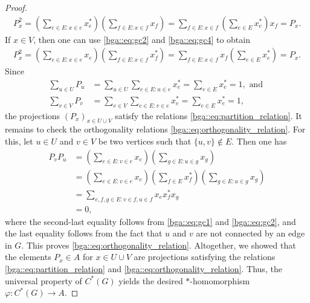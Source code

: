 \documentclass[a4paper]{amsart}
\begin{document}
\begin{proof}
    \begin{align*}
        P_x^2 = \left( \sum_{e \in E: x \in e} x_e^\ast \right) \left( \sum_{f \in E: x \in f} x_f \right)
            = \sum_{f \in E: x \in f} \left( \sum_{e \in E} x_e^\ast \right) x_f
            = P_x.
    \end{align*}
    If $x \in V$, then one can use \eqref{bga::eq:gc2} and \eqref{bga::eq:gc4} to obtain
    \begin{align*}
        P_x^2 = \left( \sum_{e \in E: x \in e} x_e \right) \left( \sum_{f \in E: x \in f} x_f^\ast \right)
            = \sum_{f \in E: x \in f} x_f \left( \sum_{e \in E} x_e^\ast \right)
            = P_x.
    \end{align*}
    Since
    \begin{align*}
        \sum_{u \in U} P_u &= \sum_{u \in U} \sum_{e \in E: u \in e} x_e^\ast = \sum_{e \in E} x_e^\ast = 1, \text{ and } \\
        \sum_{v \in V} P_v &= \sum_{v \in V} \sum_{e \in E: v \in e} x_e^\ast = \sum_{e \in E} x_e^\ast = 1,
    \end{align*}
    the projections $(P_x)_{x \in U \cup V}$ satisfy the relations \eqref{bga::eq:partition_relation}. It remains to check the orthogonality relations \eqref{bga::eq:orthogonality_relation}. For this, let $u \in U$ and $v \in V$ be two vertices such that $\{u, v\} \not \in E$. Then one has
    \begin{align*}
        P_v P_u &= \left( \sum_{e \in E: v \in e} x_e \right) \left( \sum_{g \in E: u \in g} x_g \right) \\
            &= \left( \sum_{e \in E: v \in e} x_e \right) \left( \sum_{f \in E} x_f^\ast \right) \left( \sum_{g \in E: u \in g} x_g \right)\\
            &= \sum_{e,f,g \in E: v \in f, u \in f} x_e x_f^\ast x_g \\
            &= 0,
    \end{align*}
    where the second-last equality follows from \eqref{bga::eq:gc1} and \eqref{bga::eq:gc2}, and the last equality follows from the fact that $u$ and $v$ are not connected by an edge in $G$.  This proves \eqref{bga::eq:orthogonality_relation}. Altogether, we showed that the elements $P_x \in A$ for $x \in U \cup V$ are projections satisfying the relations \eqref{bga::eq:partition_relation} and \eqref{bga::eq:orthogonality_relation}. Thus, the universal property of $C^\ast(G)$ yields the desired $\ast$-homomorphism $\varphi: C^\ast(G) \to A$.


\end{proof}
\end{document}

